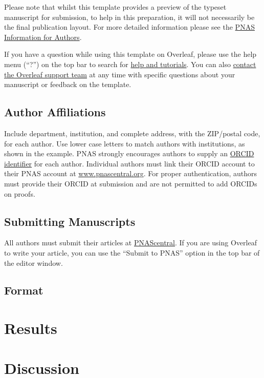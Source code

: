 \documentclass[9pt,twocolumn,twoside,lineno]{pnas-new}
\begin{document}
Please note that whilst this template provides a preview of the typeset manuscript for submission, to help in this preparation, it will not necessarily be the final publication layout. For more detailed information please see the \href{https://www.pnas.org/page/authors/format}{PNAS Information for Authors}.

If you have a question while using this template on Overleaf, please use the help menu (``?'') on the top bar to search for \href{https://www.overleaf.com/help}{help and tutorials}. You can also \href{https://www.overleaf.com/contact}{contact the Overleaf support team} at any time with specific questions about your manuscript or feedback on the template.

\subsection*{Author Affiliations}

Include department, institution, and complete address, with the ZIP/postal code, for each author. Use lower case letters to match authors with institutions, as shown in the example. PNAS strongly encourages authors to supply an \href{https://orcid.org/}{ORCID identifier} for each author. Individual authors must link their ORCID account to their PNAS account at \href{http://www.pnascentral.org/}{www.pnascentral.org}. For proper authentication, authors must provide their ORCID at submission and are not permitted to add ORCIDs on proofs.

\subsection*{Submitting Manuscripts}

All authors must submit their articles at \href{http://www.pnascentral.org/cgi-bin/main.plex}{PNAScentral}. If you are using Overleaf to write your article, you can use the ``Submit to PNAS'' option in the top bar of the editor window. 

\subsection*{Format}

\section{Results}

\section{Discussion}
\end{document}
